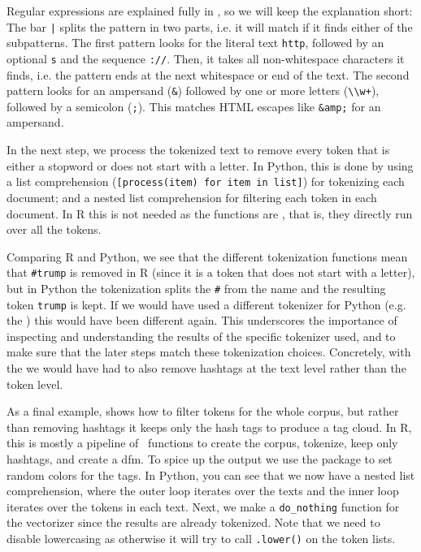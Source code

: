 Regular expressions are explained fully in , so we will keep the explanation short:
The bar \verb#|# splits the pattern in two parts, i.e. it will match if it finds either of the subpatterns.
The first pattern looks for the literal text \verb#http#, followed by an optional \verb#s# and the sequence \verb#://#.
Then, it takes all non-whitespace characters it finds, i.e. the pattern ends at the next whitespace or end of the text.
The second pattern looks for an ampersand (\verb#&#) followed by one or more letters (\verb#\\w+#), followed by a semicolon (\verb#;#).
This matches HTML escapes like \verb#&amp;# for an ampersand.

In the next step, we process the tokenized text to remove every token that is either a stopword or does not start with a letter. 
In Python, this is done by using a list comprehension (\verb#[process(item) for item in list]#) for tokenizing each document; and a nested list comprehension for filtering each token in each document.
In R this is not needed as the  functions are , that is, they directly run over all the tokens.

Comparing R and Python, we see that the different tokenization functions mean that \verb|#trump| is removed in R (since it is a token that does not start with a letter),
but in Python the tokenization splits the \verb|#| from the name and the resulting token \verb|trump| is kept.
If we would have used a different tokenizer for Python (e.g. the ) this would have been different again. 
This underscores the importance of inspecting and understanding the results of the specific tokenizer used,
and to make sure that the later steps match these tokenization choices.
Concretely, with the  we would have had to also remove hashtags at the text level rather than the token level. 


As a final example,  shows how to filter tokens for the whole corpus, but rather than removing hashtags it keeps only the hash tags to produce a tag cloud. 
In R, this is mostly a pipeline of \quanteda\ functions to create the corpus, tokenize, keep only hashtags, and create a dfm.
To spice up the output we use the  package to set random colors for the tags.
In Python, you can see that we now have a nested list comprehension, where the outer loop iterates over the texts and the inner loop iterates over the tokens in each text.
Next, we make a \verb|do_nothing| function for the vectorizer since the results are already tokenized.
Note that we need to disable lowercasing as otherwise it will try to call \verb|.lower()| on the token lists. 



